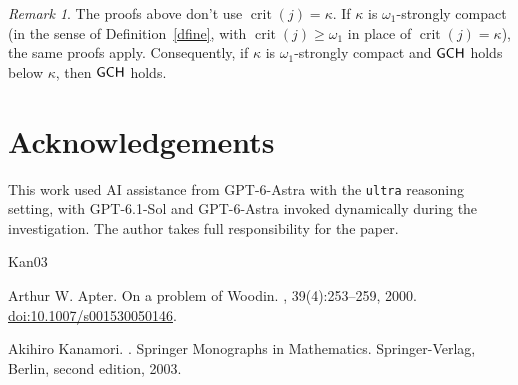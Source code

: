 \documentclass[11pt,reqno]{amsart}
\theoremstyle{definition}
\theoremstyle{remark}
\newtheorem{remark}[thm]{Remark}
\DeclareMathOperator{\crit}{crit}
\newcommand*\axiomfont[1]{\textsf{\textup{#1}}}
\newcommand\gch{\axiomfont{GCH}}
\begin{document}
\begin{remark}
    The proofs above don't use $\crit(j)=\kappa$.
    If $\kappa$ is $\omega_1$-strongly compact (in the sense of Definition~\ref{dfine}, with
    $\crit(j)\ge\omega_1$ in place of $\crit(j)=\kappa$), the same proofs apply.
    Consequently, if $\kappa$ is $\omega_1$-strongly compact and $\gch$ holds below $\kappa$, then $\gch$ holds.
\end{remark}

\section*{Acknowledgements}

This work used AI assistance from GPT-6-Astra with the \texttt{ultra} reasoning setting,
with GPT-6.1-Sol and GPT-6-Astra invoked dynamically during the investigation.
The author takes
full responsibility for the paper.

\begin{thebibliography}{Kan03}

    Arthur W. Apter.
    \newblock On a problem of Woodin.
    , 39(4):253--259, 2000.
    \newblock \href{https://doi.org/10.1007/s001530050146}{doi:10.1007/s001530050146}.

    Akihiro Kanamori.
    .
    \newblock Springer Monographs in Mathematics. Springer-Verlag, Berlin, second edition, 2003.
\end{thebibliography}
\end{document}
